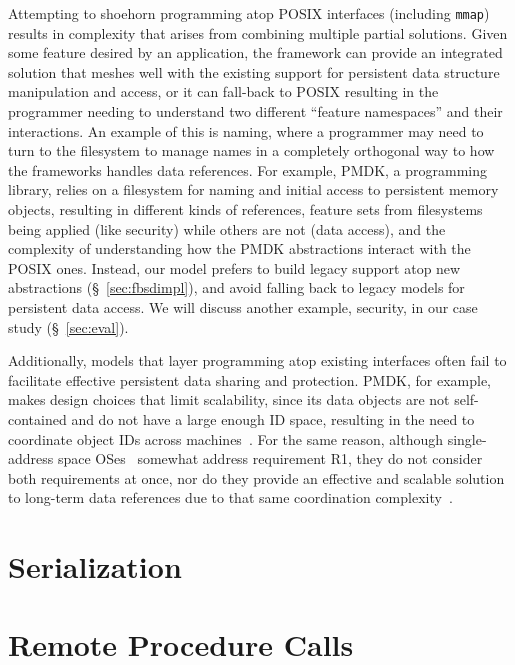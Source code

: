 {    Attempting to shoehorn \NVM programming atop POSIX interfaces (including \texttt{mmap}) results in
    complexity that arises from combining multiple partial solutions. Given some feature desired by an
    application, the \NVM framework can provide an integrated solution that meshes
    well with the existing support for persistent data structure manipulation and access, or it can
    fall-back to POSIX resulting in the programmer needing to understand two different ``feature
    namespaces'' and their interactions. An example of this is naming, where a programmer may need
    to turn to the filesystem to manage names in a completely orthogonal way to how the \NVM frameworks handles
    data references. For example, PMDK, a \NVM programming library, relies on a filesystem for naming and initial access to
    persistent memory objects, resulting in different kinds of references, feature sets from filesystems
    being applied (like security) while others are not (data access), and the complexity of
    understanding how the PMDK abstractions interact with the POSIX ones. Instead, our model prefers to
    build legacy support atop new abstractions (\S~\ref{sec:fbsdimpl}), and avoid falling back to legacy
    models for persistent data access. We will discuss another example,
    security, in our case study (\S~\ref{sec:eval}).


    Additionally, models that layer \NVM programming atop existing interfaces often fail to facilitate effective persistent data sharing and
    protection.  PMDK, for example, makes design choices that limit
    scalability, since its
    data objects are not self-contained and do not have a large enough ID space, resulting
    in the need to coordinate object IDs across machines~\cite{bittman:plos19}. For the same reason,
    although single-address space OSes~\cite{chase:tocs94} somewhat address requirement R1, they do
    not consider both requirements at once, nor do they provide an effective and scalable solution to
    long-term data references due to that same coordination complexity~\cite{bittman:hotstorage19}.


}




\section{Serialization}

\section{Remote Procedure Calls}